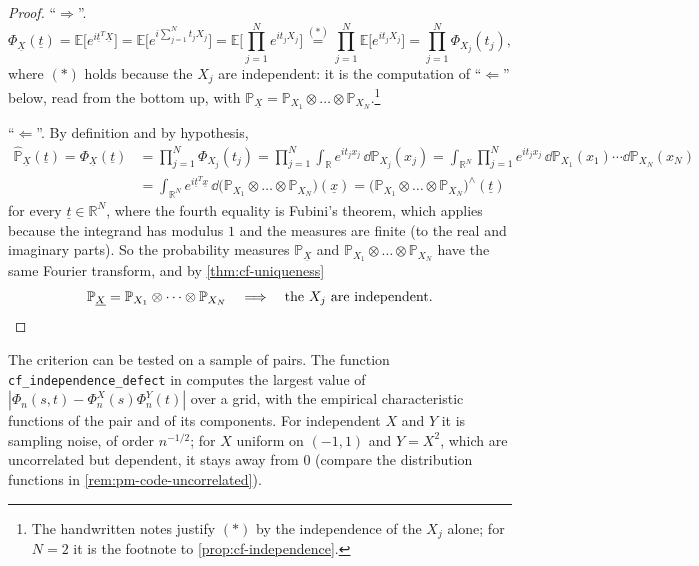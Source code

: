 \begin{proof}
``$\Rightarrow$''.
\[
  \Phi_{\underline X}(\underline t)=\mathbb E\big[e^{i\underline t^T\underline X}\big]
  =\mathbb E\Big[e^{i\sum_{j=1}^Nt_jX_j}\Big]=\mathbb E\Big[\prod_{j=1}^Ne^{it_jX_j}\Big]
  \overset{(\ast)}{=}\prod_{j=1}^N\mathbb E\big[e^{it_jX_j}\big]=\prod_{j=1}^N\Phi_{X_j}(t_j),
\]
where $(\ast)$ holds because the $X_j$ are independent: it is the computation of
``$\Leftarrow$'' below, read from the bottom up, with
$\mathbb P_{\underline X}=\mathbb P_{X_1}\otimes\dots\otimes\mathbb P_{X_N}$.\footnote{The
handwritten notes justify $(\ast)$ by the independence of the $X_j$ alone; for $N=2$ it is the
footnote to \cref{prop:cf-independence}.}

``$\Leftarrow$''. By definition and by hypothesis,
\[
\begin{aligned}
  \hat{\mathbb P}_{\underline X}(\underline t)=\Phi_{\underline X}(\underline t)
  &=\prod_{j=1}^N\Phi_{X_j}(t_j)=\prod_{j=1}^N\int_{\mathbb R}e^{it_jx_j}\,\dd\mathbb P_{X_j}(x_j)
  =\int_{\mathbb R^N}\prod_{j=1}^Ne^{it_jx_j}\,\dd\mathbb P_{X_1}(x_1)\cdots\dd\mathbb P_{X_N}(x_N)\\
  &=\int_{\mathbb R^N}e^{i\underline t^T\underline x}\,\dd\big(\mathbb P_{X_1}\otimes\dots\otimes\mathbb P_{X_N}\big)(\underline x)
  =\big(\mathbb P_{X_1}\otimes\dots\otimes\mathbb P_{X_N}\big)^{\wedge}(\underline t)
\end{aligned}
\]
for every $\underline t\in\mathbb R^N$, where the fourth equality is Fubini's theorem, which
applies because the integrand has modulus $1$ and the measures are finite (to the real and
imaginary parts). So the probability measures $\mathbb P_{\underline X}$ and
$\mathbb P_{X_1}\otimes\dots\otimes\mathbb P_{X_N}$ have the same Fourier transform, and by
\cref{thm:cf-uniqueness}
\[
  \mathbb P_{\underline X}=\mathbb P_{X_1}\otimes\dots\otimes\mathbb P_{X_N}
  \quad\Longrightarrow\quad\text{the $X_j$ are independent.}\qedhere
\]
\end{proof}

\begin{remark}[computational]\label{rem:cf-code-independence}
The criterion can be tested on a sample of pairs. The function
\texttt{cf\_independence\_defect} in  computes the largest
value of
$|\Phi_n(s,t)-\Phi_n^X(s)\Phi_n^Y(t)|$ over a grid, with the empirical characteristic functions
of the pair and of its components. For independent $X$ and $Y$ it is sampling noise, of order
$n^{-1/2}$; for $X$ uniform on $(-1,1)$ and $Y=X^2$, which are uncorrelated but dependent, it
stays away from $0$ (compare the distribution functions in \cref{rem:pm-code-uncorrelated}).
\end{remark}

